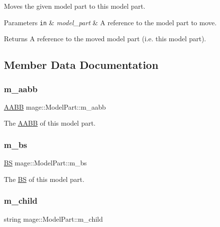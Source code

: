 Moves the given model part to this model part.


\begin{DoxyParams}[1]{Parameters}
\mbox{\tt in}  & {\em model\+\_\+part} & A reference to the model part to move. \\
\hline
\end{DoxyParams}
\begin{DoxyReturn}{Returns}
A reference to the moved model part (i.\+e. this model part). 
\end{DoxyReturn}


\subsection{Member Data Documentation}
\hypertarget{structmage_1_1_model_part_ab5b4cb74ac7d725896825b0f7ce8472a}{}\label{structmage_1_1_model_part_ab5b4cb74ac7d725896825b0f7ce8472a} 
\subsubsection{\texorpdfstring{m\+\_\+aabb}{m\_aabb}}
{\footnotesize\ttfamily \hyperlink{structmage_1_1_a_a_b_b}{A\+A\+BB} mage\+::\+Model\+Part\+::m\+\_\+aabb}

The \hyperlink{structmage_1_1_a_a_b_b}{A\+A\+BB} of this model part. \hypertarget{structmage_1_1_model_part_a551f6c340fa5547364e6cde9720ad856}{}\label{structmage_1_1_model_part_a551f6c340fa5547364e6cde9720ad856} 
\subsubsection{\texorpdfstring{m\+\_\+bs}{m\_bs}}
{\footnotesize\ttfamily \hyperlink{structmage_1_1_b_s}{BS} mage\+::\+Model\+Part\+::m\+\_\+bs}

The \hyperlink{structmage_1_1_b_s}{BS} of this model part. \hypertarget{structmage_1_1_model_part_abac2e9942c2d8015dc8b4f363729dc45}{}\label{structmage_1_1_model_part_abac2e9942c2d8015dc8b4f363729dc45} 
\subsubsection{\texorpdfstring{m\+\_\+child}{m\_child}}
{\footnotesize\ttfamily string mage\+::\+Model\+Part\+::m\+\_\+child}

